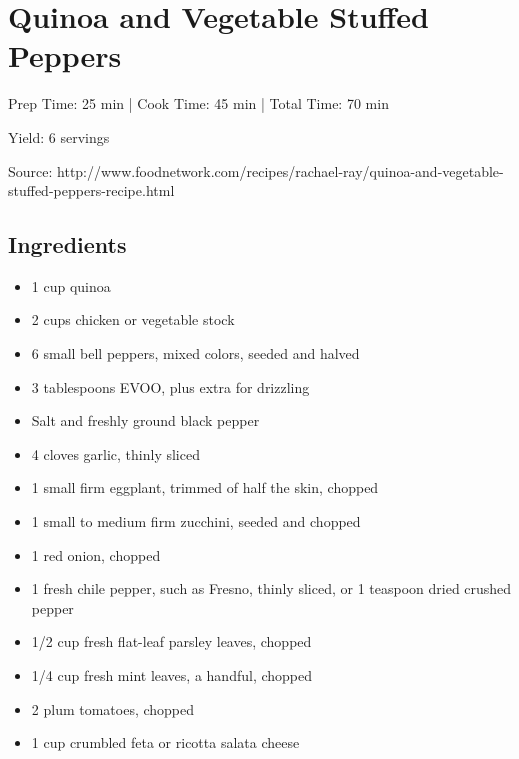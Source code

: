 \section{Quinoa and Vegetable Stuffed Peppers}

\begin{center}
Prep Time: 25 min |
Cook Time: 45 min |
Total Time: 70 min

\noindent Yield: 6 servings

\vspace{1em}

Source: http://www.foodnetwork.com/recipes/rachael-ray/quinoa-and-vegetable-stuffed-peppers-recipe.html
\end{center}

\subsection{Ingredients}
\begin{multicols}{2}
\begin{itemize}
    \item 1 cup quinoa
    \item 2 cups chicken or vegetable stock
    \item 6 small bell peppers, mixed colors, seeded and halved
    \item 3 tablespoons EVOO, plus extra for drizzling
    \item Salt and freshly ground black pepper
    \item 4 cloves garlic, thinly sliced
    \item 1 small firm eggplant, trimmed of half the skin, chopped
    \item 1 small to medium firm zucchini, seeded and chopped
    \item 1 red onion, chopped
    \item 1 fresh chile pepper, such as Fresno, thinly sliced, or 1 teaspoon dried crushed pepper
    \item 1/2 cup fresh flat-leaf parsley leaves, chopped
    \item 1/4 cup fresh mint leaves, a handful, chopped
    \item 2 plum tomatoes, chopped
    \item 1 cup crumbled feta or ricotta salata cheese
\end{itemize}
\end{multicols}

